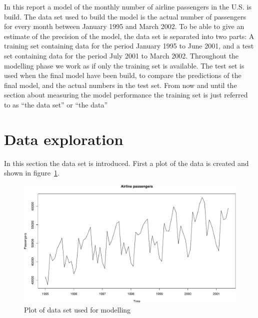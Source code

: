 \def\assignmenttitle{Modelling and Predicting the Number of Airline Passengers}
\def\assignmentnumber{3}
\def\assignmentdate{29-10-2011}





\maketitle


In this report a model of the monthly number of airline passengers in the U.S.
is build. The data set used to build the model is the actual number of
passengers for every month between January 1995 and March 2002. To be able to
give an estimate of the precision of the model, the data set is separated into
two parts: A training set containing data for the period January 1995 to June
2001, and a test set containing data for the period July 2001 to March 2002.
Throughout the modelling phase we work as if only the training set is
available. The test set is used when the final model have been build, to
compare the predictions of the final model, and the actual numbers in the test
set. From now and until the section about measuring the model performance the
training set is just referred to as ``the data set'' or ``the data''


\section*{Data exploration}

In this section the data set is introduced. First a plot of the data is created
and shown in figure~\ref{fig:trainingset}. \par

\begin{figure}[ht]
\centering
\includegraphics[width=120mm]{../plots/trainingset.pdf}
\caption{Plot of data set used for modelling}
\label{fig:trainingset}
\end{figure}


